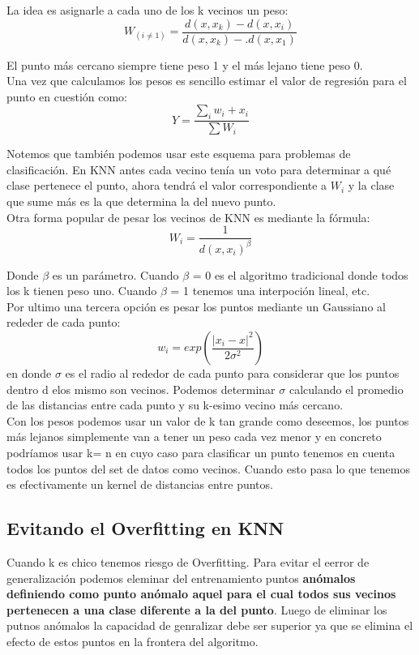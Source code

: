 \documentclass[titlepage,a4paper]{article}
\begin{document}
La idea es asignarle a cada uno de los k vecinos un peso: $$W_(i\neq1) = \frac{d(x,x_k) - d(x,x_i)}{d(x,x_k) - .d(x,x_1)} $$

El punto más cercano siempre tiene peso 1 y el más lejano tiene peso 0. \\

Una vez que calculamos los pesos es sencillo estimar el valor de regresión para el punto en cuestión como: $$ Y= \frac{\sum_i w_i + x_i}{\sum W_i} $$

Notemos que también podemos usar este esquema para problemas de clasificación. En KNN antes cada vecino tenía un voto para determinar a qué clase pertenece el punto, ahora tendrá el valor correspondiente a $W_i$ y la clase que sume más es la que determina la del nuevo punto. \\

Otra forma popular de pesar los vecinos de KNN es mediante la fórmula: $$ W_i = \frac{1}{d(x,x_i)^\beta}$$

Donde $\beta$ es un parámetro. Cuando $\beta$ = 0  es el algoritmo tradicional donde todos los k tienen peso uno. Cuando $\beta$ = 1 tenemos una interpoción lineal, etc. \\

Por ultimo una tercera opción es pesar los puntos mediante un Gaussiano al rededer de cada punto: $$w_i = exp\left(\frac{|x_i -x|^2}{2\sigma^2}\right)$$
en donde $\sigma$ es el radio al rededor de cada punto para considerar que los puntos dentro d elos mismo son vecinos. Podemos determinar $\sigma$ calculando el promedio de las distancias entre cada punto y su k-esimo vecino más cercano. \\

Con los pesos podemos usar un valor de k tan grande como deseemos, los puntos más lejanos simplemente van a tener un peso cada vez menor y en concreto podríamos usar k= n en cuyo caso para clasificar un punto tenemos en cuenta todos los puntos del set de datos como vecinos. Cuando esto pasa lo que tenemos es efectivamente un kernel de distancias entre puntos. \\

\subsection*{Evitando el Overfitting en KNN}
Cuando k es chico tenemos riesgo de Overfitting. Para evitar el eerror de generalización podemos eleminar del entrenamiento puntos \textbf{anómalos definiendo como punto anómalo aquel  para el cual todos sus vecinos pertenecen a una clase diferente a la del punto}. Luego de eliminar los putnos anómalos la capacidad de genralizar debe ser superior ya que se elimina el efecto de estos puntos en la frontera del algoritmo. \\
\end{document}

